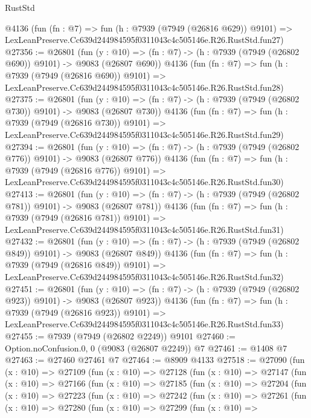 \begin{lexlean}{RustStd}
\begin{coremodule}
    @4136
    (fun (fn : @7) =>
    fun (h : @7939 (@7949 (@26816 @629)) @9101) =>
    LexLeanPreserve.Cc639d244984595f0311043c4c505146e.R26.RustStd.fun27)
@27356 := @26801
    (fun (y : @10) => (fn : @7) -> (h : @7939 (@7949 (@26802 @690)) @9101) -> @9083 (@26807 @690))
    @4136
    (fun (fn : @7) =>
    fun (h : @7939 (@7949 (@26816 @690)) @9101) =>
    LexLeanPreserve.Cc639d244984595f0311043c4c505146e.R26.RustStd.fun28)
@27375 := @26801
    (fun (y : @10) => (fn : @7) -> (h : @7939 (@7949 (@26802 @730)) @9101) -> @9083 (@26807 @730))
    @4136
    (fun (fn : @7) =>
    fun (h : @7939 (@7949 (@26816 @730)) @9101) =>
    LexLeanPreserve.Cc639d244984595f0311043c4c505146e.R26.RustStd.fun29)
@27394 := @26801
    (fun (y : @10) => (fn : @7) -> (h : @7939 (@7949 (@26802 @776)) @9101) -> @9083 (@26807 @776))
    @4136
    (fun (fn : @7) =>
    fun (h : @7939 (@7949 (@26816 @776)) @9101) =>
    LexLeanPreserve.Cc639d244984595f0311043c4c505146e.R26.RustStd.fun30)
@27413 := @26801
    (fun (y : @10) => (fn : @7) -> (h : @7939 (@7949 (@26802 @781)) @9101) -> @9083 (@26807 @781))
    @4136
    (fun (fn : @7) =>
    fun (h : @7939 (@7949 (@26816 @781)) @9101) =>
    LexLeanPreserve.Cc639d244984595f0311043c4c505146e.R26.RustStd.fun31)
@27432 := @26801
    (fun (y : @10) => (fn : @7) -> (h : @7939 (@7949 (@26802 @849)) @9101) -> @9083 (@26807 @849))
    @4136
    (fun (fn : @7) =>
    fun (h : @7939 (@7949 (@26816 @849)) @9101) =>
    LexLeanPreserve.Cc639d244984595f0311043c4c505146e.R26.RustStd.fun32)
@27451 := @26801
    (fun (y : @10) => (fn : @7) -> (h : @7939 (@7949 (@26802 @923)) @9101) -> @9083 (@26807 @923))
    @4136
    (fun (fn : @7) =>
    fun (h : @7939 (@7949 (@26816 @923)) @9101) =>
    LexLeanPreserve.Cc639d244984595f0311043c4c505146e.R26.RustStd.fun33)
@27455 := @7939 (@7949 (@26802 @2249)) @9101
@27460 := Option.noConfusion.{0, 0} (@9083 (@26807 @2249)) @7
@27461 := @1408 @7
@27463 := @27460 @27461 @7
@27464 := @8909 @4133
@27518 := @27090
    (fun (x : @10) =>
    @27109
      (fun (x : @10) =>
      @27128
        (fun (x : @10) =>
        @27147
          (fun (x : @10) =>
          @27166
            (fun (x : @10) =>
            @27185
              (fun (x : @10) =>
              @27204
                (fun (x : @10) =>
                @27223
                  (fun (x : @10) =>
                  @27242
                    (fun (x : @10) =>
                    @27261
                      (fun (x : @10) =>
                      @27280
                        (fun (x : @10) =>
                        @27299
                          (fun (x : @10) =>

\end{coremodule}
\end{lexlean}
